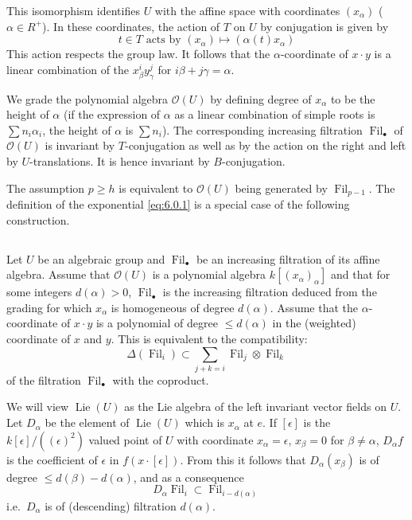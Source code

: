 \documentclass[11pt,a4paper]{article}
\theoremstyle{plain}
\theoremstyle{definition}
\DeclareMathOperator{\Lie}{Lie}
\DeclareMathOperator{\Fil}{Fil}
\begin{document}
This isomorphism identifies $U$ with the affine space with coordinates $(x_\alpha)$ ($\alpha \in R^+$). In these coordinates, the action of $T$ on $U$ by conjugation is given by
\[
t \in T \text{ acts by } (x_\alpha) \mapsto (\alpha(t) x_\alpha)
\]
This action respects the group law. It follows that the $\alpha$-coordinate of $x \cdot y$ is a linear combination of the $x_\beta^i y_\gamma^j$ for $i\beta + j\gamma = \alpha$.

We grade the polynomial algebra $\mathcal{O}(U)$ by defining degree of $x_\alpha$ to be the height of $\alpha$ (if the expression of $\alpha$ as a linear combination of simple roots is $\sum n_i \alpha_i$, the height of $\alpha$ is $\sum n_i$). The corresponding increasing filtration $\Fil_\bullet$ of $\mathcal{O}(U)$ is invariant by $T$-conjugation as well as by the action on the right and left by $U$-translations. It is hence invariant by $B$-conjugation.

The assumption $p \geq h$ is equivalent to $\mathcal{O}(U)$ being generated by $\Fil_{p-1}$. The definition of the exponential \eqref{eq:6.0.1} is a special case of the following construction.

\subsection{} \label{sec:6.2}
Let $U$ be an algebraic group and $\Fil_\bullet$ be an increasing filtration of its affine algebra. Assume that $\mathcal{O}(U)$ is a polynomial algebra $k[(x_\alpha)_\alpha]$ and that for some integers $d(\alpha) > 0$, $\Fil_\bullet$ is the increasing filtration deduced from the grading for which $x_\alpha$ is homogeneous of degree $d(\alpha)$. Assume that the $\alpha$-coordinate of $x \cdot y$ is a polynomial of degree $\leq d(\alpha)$ in the (weighted) coordinate of $x$ and $y$. This is equivalent to the compatibility:
\begin{equation} \label{eq:6.2.1}
\Delta(\Fil_i) \subset \sum_{j+k=i} \Fil_j \otimes \Fil_k
\end{equation}
of the filtration $\Fil_\bullet$ with the coproduct.

We will view $\Lie(U)$ as the Lie algebra of the left invariant vector fields on $U$. Let $D_\alpha$ be the element of $\Lie(U)$ which is $x_\alpha$ at $e$. If $[\epsilon]$ is the $k[\epsilon]/((\epsilon)^2)$ valued point of $U$ with coordinate $x_\alpha = \epsilon$, $x_\beta = 0$ for $\beta \neq \alpha$, $D_\alpha f$ is the coefficient of $\epsilon$ in $f(x \cdot [\epsilon])$. From this it follows that $D_\alpha(x_\beta)$ is of degree $\leq d(\beta) - d(\alpha)$, and as a consequence
\begin{equation} \label{eq:6.2.2}
D_\alpha \Fil_i \subset \Fil_{i - d(\alpha)}
\end{equation}
i.e.~$D_\alpha$ is of (descending) filtration $d(\alpha)$.
\end{document}
